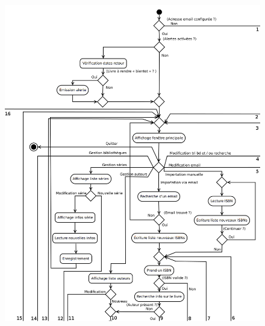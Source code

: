 \begin{figure}[h!]
\begin{center}
\includegraphics[width=16cm, height=19cm]{uml/appli_pc/p1.png}
\end{center}
\end{figure}
\newpage{}

